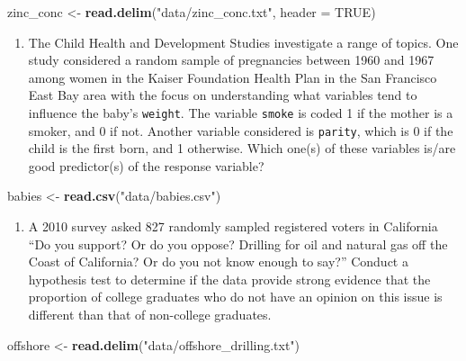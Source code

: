 \documentclass[]{article}
\newenvironment{Shaded}{\begin{snugshade}}{\end{snugshade}}
\newcommand{\KeywordTok}[1]{\textcolor[rgb]{0.13,0.29,0.53}{\textbf{{#1}}}}
\newcommand{\DataTypeTok}[1]{\textcolor[rgb]{0.13,0.29,0.53}{{#1}}}
\newcommand{\StringTok}[1]{\textcolor[rgb]{0.31,0.60,0.02}{{#1}}}
\newcommand{\OtherTok}[1]{\textcolor[rgb]{0.56,0.35,0.01}{{#1}}}
\newcommand{\NormalTok}[1]{{#1}}
\providecommand{\tightlist}{%
  \setlength{\itemsep}{0pt}\setlength{\parskip}{0pt}}
\begin{document}
\begin{Shaded}
\begin{Highlighting}[]
\NormalTok{zinc_conc <-}\StringTok{ }\KeywordTok{read.delim}\NormalTok{(}\StringTok{"data/zinc_conc.txt"}\NormalTok{, }\DataTypeTok{header =} \OtherTok{TRUE}\NormalTok{)}
\end{Highlighting}
\end{Shaded}

\begin{enumerate}
\def\labelenumi{\arabic{enumi}.}
\setcounter{enumi}{8}
\tightlist
\item
  The Child Health and Development Studies investigate a range of
  topics. One study considered a random sample of pregnancies between
  1960 and 1967 among women in the Kaiser Foundation Health Plan in the
  San Francisco East Bay area with the focus on understanding what
  variables tend to influence the baby's \texttt{weight}. The variable
  \texttt{smoke} is coded 1 if the mother is a smoker, and 0 if not.
  Another variable considered is \texttt{parity}, which is 0 if the
  child is the first born, and 1 otherwise. Which one(s) of these
  variables is/are good predictor(s) of the response variable?
\end{enumerate}

\begin{Shaded}
\begin{Highlighting}[]
\NormalTok{babies <-}\StringTok{ }\KeywordTok{read.csv}\NormalTok{(}\StringTok{"data/babies.csv"}\NormalTok{)}
\end{Highlighting}
\end{Shaded}

\begin{enumerate}
\def\labelenumi{\arabic{enumi}.}
\setcounter{enumi}{3}
\tightlist
\item
  A 2010 survey asked 827 randomly sampled registered voters in
  California ``Do you support? Or do you oppose? Drilling for oil and
  natural gas off the Coast of California? Or do you not know enough to
  say?'' Conduct a hypothesis test to determine if the data provide
  strong evidence that the proportion of college graduates who do not
  have an opinion on this issue is different than that of non-college
  graduates.
\end{enumerate}

\begin{Shaded}
\begin{Highlighting}[]
\NormalTok{offshore <-}\StringTok{ }\KeywordTok{read.delim}\NormalTok{(}\StringTok{"data/offshore_drilling.txt"}\NormalTok{)}
\end{Highlighting}
\end{Shaded}
\end{document}
